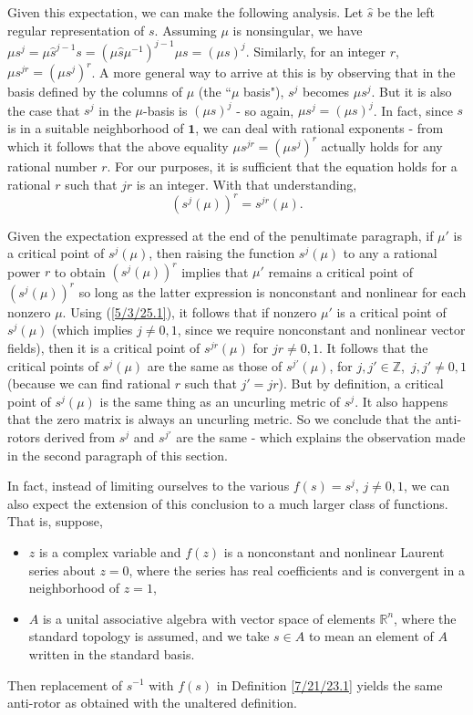\documentclass{amsart}
\numberwithin{equation}{section}
\theoremstyle{definition}
\numberwithin{theorem}{section}
\begin{document}
Given this expectation, we can make the following analysis.
Let $\hat{s}$ be the left regular representation of $s$.  Assuming $\mu$ is nonsingular, we have $\mu s^j = \mu \hat{s}^{j-1}s = (\mu \hat{s} \mu^{-1})^{j-1}\mu s = (\mu s)^j$.  Similarly, for an integer $r$, $\mu s^{jr} = (\mu s^j)^r $.  A more general way to arrive at this is by observing that in the basis defined by the columns of $\mu$ (the ``$\mu$ basis"), $s^j$ becomes $\mu s^j$.  But it is also the case that $s^j$ in the $\mu$-basis is $(\mu s)^j$ - so again, $\mu s^j = (\mu s)^j$.   In fact, since $s$ is in a suitable neighborhood of $\mathbf{1}$, we can deal with rational exponents - from which it follows that the above equality $\mu s^{jr} = (\mu s^j)^r $ actually holds for any rational number $r$.  For our purposes, it is sufficient that the equation holds for a rational $r$ such that $jr$ is an integer.  With that understanding, \begin{equation}\label{5/3/25.1} \left(s^j(\mu)\right)^r = s^{jr}(\mu).\end{equation}

Given the expectation expressed at the end of the penultimate paragraph, if $\mu'$ is a critical point of $s^j(\mu)$, then raising the function $s^j(\mu)$ to any a rational power $r$ to obtain $\left(s^j(\mu)\right)^r$ implies that $\mu'$ remains a critical point of $\left(s^j(\mu)\right)^r$ so long as the latter expression is nonconstant and nonlinear for each nonzero $\mu$.  Using (\ref{5/3/25.1}), it follows that if nonzero $\mu'$ is a critical point of $s^j(\mu)$ (which implies $j\ne 0,1$, since we require nonconstant and nonlinear vector fields), then it is a critical point of $s^{jr}(\mu)$ for $jr\ne 0,1$.   It follows that the critical points of $s^j(\mu)$ are the same as those of $s^{j'}(\mu)$, for $j,j'\in \mathbb{Z}$,\, $j,j'\ne 0,1$ (because we can find rational $r$ such that $j'=jr$). But by definition, a critical point of $s^j(\mu)$ is the same thing as an uncurling metric of $s^j$. It also happens that the zero matrix is always an uncurling metric.  So we conclude that the anti-rotors derived from $s^j$ and $s^{j'}$ are the same - which explains the observation made in the second paragraph of this section.

 In fact, instead of limiting ourselves to the various $f(s)=s^j$, $j\ne 0,1$, we can also expect the extension of this conclusion to a much larger class of functions.  That is, suppose, \begin{itemize}\item $z$ is a complex variable and $f(z)$ is a nonconstant and nonlinear Laurent series about $z=0$, where the series has real coefficients and is convergent in a neighborhood of $z=1$,  
\item  $A$ is a unital associative algebra with vector space of elements $\mathbb{R}^n$, where the standard topology is assumed, and we take $s \in A$ to mean an element of $A$ written in the standard basis.
\end{itemize}
Then replacement of $s^{-1}$ with $f(s)$ in Definition \ref{7/21/23.1} yields the same anti-rotor as obtained with the unaltered definition.
\end{document}
